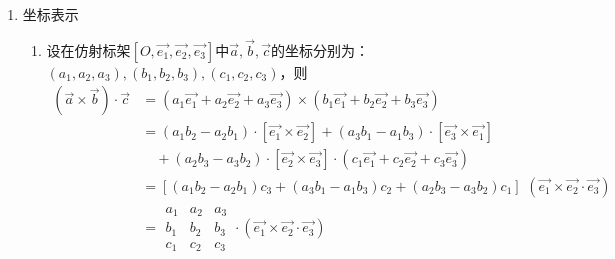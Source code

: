 \begin{enumerate}[1.]
	\item {\color{dy2}坐标表示}
	\begin{enumerate}[]
				\setlength{\itemindent}{1.5em} 
		\setlength{\topsep}{0.01em}
		\setlength{\itemsep}{0.01em}
		\item 设在仿射标架$[O,\overrightarrow{e_1},\overrightarrow{e_2},\overrightarrow{e_3}]$中$\overrightarrow{a},\overrightarrow{b},\overrightarrow{c}$的坐标分别为：$(a_1,a_2,a_3),(b_1,b_2,b_3),(c_1,c_2,c_3)$，则
		\begin{equation}
			\begin{aligned}
				(\overrightarrow{a} \times \overrightarrow{b})\cdot \overrightarrow{c}&=(a_1\overrightarrow{e_1}+a_2\overrightarrow{e_2}+a_3\overrightarrow{e_3})\times (b_1\overrightarrow{e_1}+b_2\overrightarrow{e_2}+b_3\overrightarrow{e_3})\\
				&=\left( a_1b_2-a_2b_1\right)\cdot \left[\overrightarrow{e_1}\times \overrightarrow{e_2}\right]+\left(a_3b_1-a_1b_3\right)\cdot \left[\overrightarrow{e_3}\times \overrightarrow{e_1}\right]\\
				&\quad +\left(a_2b_3-a_3b_2\right)\cdot \left[\overrightarrow{e_2}\times \overrightarrow{e_3}\right]\cdot \left( c_1\overrightarrow{e_1}+c_2\overrightarrow{e_2}+c_3\overrightarrow{e_3}\right) \\
				&=[(a_1b_2-a_2b_1)c_3+(a_3b_1-a_1b_3)c_2+(a_2b_3-a_3b_2)c_1]\,\,(\overrightarrow{e_1}\times \overrightarrow{e_2}\cdot \overrightarrow{e_3})\\
				&=\begin{array}{|ccc|}
					a_1 & a_2 & a_3 \\
					b_1 & b_2 & b_3 \\
					c_1 & c_2 & c_3
				\end{array}\cdot (\overrightarrow{e_1}\times \overrightarrow{e_2}\cdot \overrightarrow{e_3})
			\end{aligned}
		\end{equation}
\end{enumerate}
\end{enumerate}
